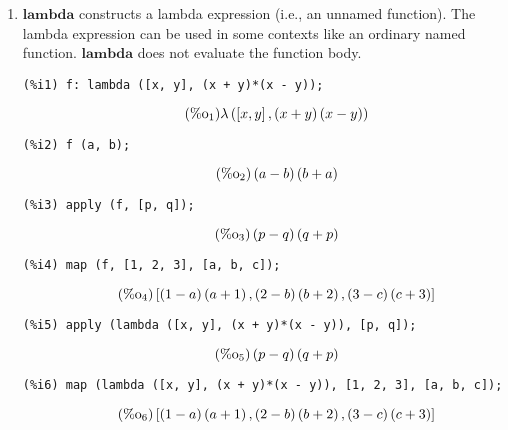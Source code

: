 \documentclass[12pt,leqno]{article}
\begin{document}
\begin{enumerate}
\item $\mathbf{lambda}$ constructs a lambda expression (i.e., an unnamed function).
The lambda expression can be used in some contexts like an ordinary named function.
$\mathbf{lambda}$ does not evaluate the function body.
\begin{verbatim}
(%i1) f: lambda ([x, y], (x + y)*(x - y));
\end{verbatim}
\begin{equation}
\tag{$\mathop{\mathrm{\%o}}_{1}$}\lambda\left(\left[x, y\right], \left(x+y\right) \left(x-y\right)\right)
\label{eq:doc-group1-code25-1-1}
\end{equation}
\begin{verbatim}
(%i2) f (a, b);
\end{verbatim}
\begin{equation}
\tag{$\mathop{\mathrm{\%o}}_{2}$}\left(a-b\right) \left(b+a\right)
\label{eq:doc-group1-code25-2-1}
\end{equation}
\begin{verbatim}
(%i3) apply (f, [p, q]);
\end{verbatim}
\begin{equation}
\tag{$\mathop{\mathrm{\%o}}_{3}$}\left(p-q\right) \left(q+p\right)
\label{eq:doc-group1-code25-3-1}
\end{equation}
\begin{verbatim}
(%i4) map (f, [1, 2, 3], [a, b, c]);
\end{verbatim}
\begin{equation}
\tag{$\mathop{\mathrm{\%o}}_{4}$}\left[\left(1-a\right) \left(a+1\right), \left(2-b\right) \left(b+2\right), \left(3-c\right) \left(c+3\right)\right]
\label{eq:doc-group1-code25-4-1}
\end{equation}
\begin{verbatim}
(%i5) apply (lambda ([x, y], (x + y)*(x - y)), [p, q]);
\end{verbatim}
\begin{equation}
\tag{$\mathop{\mathrm{\%o}}_{5}$}\left(p-q\right) \left(q+p\right)
\label{eq:doc-group1-code25-5-1}
\end{equation}
\begin{verbatim}
(%i6) map (lambda ([x, y], (x + y)*(x - y)), [1, 2, 3], [a, b, c]);
\end{verbatim}
\begin{equation}
\tag{$\mathop{\mathrm{\%o}}_{6}$}\left[\left(1-a\right) \left(a+1\right), \left(2-b\right) \left(b+2\right), \left(3-c\right) \left(c+3\right)\right]
\label{eq:doc-group1-code25-6-1}
\end{equation}


\end{enumerate}
\end{document}
